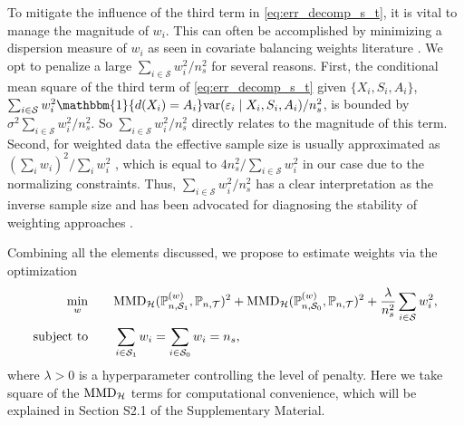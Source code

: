 \documentclass[12pt]{article}
\newcommand{\prob}{\mathbb{P}}
\newcommand{\ind}{\mathbbm{1}}
\newcommand{\var}{\textnormal{var}}
\begin{document}
To mitigate the influence of the third term in \eqref{eq:err_decomp_s_t}, it is vital to manage the magnitude of $w_i$. This can often be accomplished by minimizing a dispersion measure of $w_i$ as seen in covariate balancing weights literature \citep{hainmueller2012entropy,chan2016globally,wang2020minimal}. We opt to penalize a large $\sum_{i \in \mathcal{S}} w_i^2/ n_s^2 $ for several reasons. First, the conditional mean square of the third term of \eqref{eq:err_decomp_s_t} given $\{X_i, S_i, A_i\}$, $\sum_{i \in \mathcal{S}} w_i^2 \ind \{d(X_i) = A_i \} \var(\varepsilon_i \mid X_i, S_i, A_i)/ n_s^2$, is bounded by $ \sigma^2 \sum_{i \in \mathcal{S}}  w_i^2/ n_s^2$. So $\sum_{i \in \mathcal{S}} w_i^2/  n_s^2$ directly relates to the magnitude of this term. Second, for weighted data the effective sample size is usually approximated as $(\sum_i w_i)^2 / \sum_i w_i^2$ \citep{kish1965survey}, which is equal to $4 n_s^2 / \sum_{i \in \mathcal{S}} w_i^2$ in our case due to the normalizing constraints. Thus, $\sum_{i \in \mathcal{S}} w_i^2/n_s^2$ has a clear interpretation as the inverse sample size and has been advocated for diagnosing the stability of weighting approaches \citep{chattopadhyay2020balancing}.

Combining all the elements discussed, we propose to estimate weights via the optimization
\begin{equation}
    \label{eq:opt_prog_s_t}
    \begin{aligned}
    \min_w &\qquad
    \textnormal{MMD}_\mathcal{H}(\prob_{n,\mathcal{S}_1}^{(w)}, \prob_{n,\mathcal{T}})^2 + 
    \textnormal{MMD}_\mathcal{H}(\prob_{n,\mathcal{S}_0}^{(w)}, \prob_{n,\mathcal{T}})^2 +
    \frac{\lambda}{n_s^2} \sum_{i \in \mathcal{S}} w_i^2,
    \\
    \textnormal{subject to}&\qquad
    \sum_{i \in \mathcal{S}_1} w_i = \sum_{i \in \mathcal{S}_0} w_i = n_s
    ,\end{aligned}
\end{equation}
where $\lambda > 0$ is a hyperparameter controlling the level of penalty. Here we take square of the $\textnormal{MMD}_\mathcal{H}$ terms for computational convenience, which will be explained in Section S2.1 of the Supplementary Material.
\end{document}
